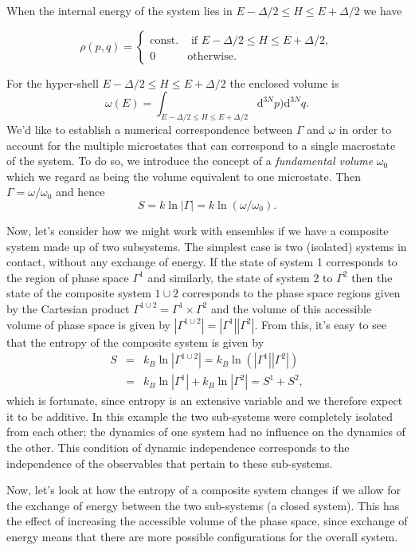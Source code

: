 When the internal energy of the system lies in $E-\Delta/2 \leq H \leq E+\Delta/2$ we have


\[ 
	\rho(p,q) = 
\begin{cases} 
      \mbox{const.} & \mbox{ if } E-\Delta/2 \leq H \leq E+\Delta/2, \\
      0 & \mbox{otherwise.} 
   \end{cases}
\]

For the hyper-shell $E-\Delta/2\leq H \leq E+\Delta/2$ the enclosed volume is
\[
\omega(E) = \int_{E-\Delta/2\leq H \leq E+\Delta/2} \mathrm{d}^{3N}p)\mathrm{d}^{3N}q.
\]
We'd like to establish a numerical correspondence between $\Gamma$ and $\omega$ in order to account for the multiple microstates that can correspond to a single macrostate of the system. To do so, we introduce the concept of a \emph{fundamental volume} $\omega_0$ which we regard as being the volume equivalent to one microstate. Then $\Gamma = \omega/\omega_0$ and hence
\[
S =k \ln|\Gamma| = k\ln(\omega/\omega_0).
\]


Now, let's consider how we might work with ensembles if we have a composite system made up of two subsystems. The simplest case is two (isolated) systems in contact, without any exchange of energy. If the state of system 1 corresponds to the region of phase space $\Gamma^1$ and similarly, the state of system 2 to $\Gamma^2$ then the state of the composite system $1\cup 2$ corresponds to the phase space regions given by the Cartesian product $\Gamma^{1\cup 2}=\Gamma^1\times\Gamma^2$ and the volume of this accessible volume of phase space is given by $|\Gamma^{1\cup 2}|=|\Gamma^1||\Gamma^2|$. From this, it's easy to see that the entropy of the composite system is given by
\begin{eqnarray*}
	S &=& k_B\ln|\Gamma^{1\cup 2}| = k_B\ln(|\Gamma^1||\Gamma^2|)\\
		&=& k_B\ln|\Gamma^1| + k_B\ln|\Gamma^2| = S^1 + S^2,
\end{eqnarray*}
which is fortunate, since entropy is an extensive variable and we therefore expect it to be additive.
In this example the two sub-systems were completely isolated from each other; the dynamics of one system had no influence on the dynamics of the other. This condition of dynamic independence corresponds to the independence of the observables that pertain to these sub-systems.

Now, let's look at how the entropy of a composite system changes if we allow for the exchange of energy between the two sub-systems (a closed system). This has the effect of increasing the accessible volume of the phase space, since exchange of energy means that there are more possible configurations for the overall system.

